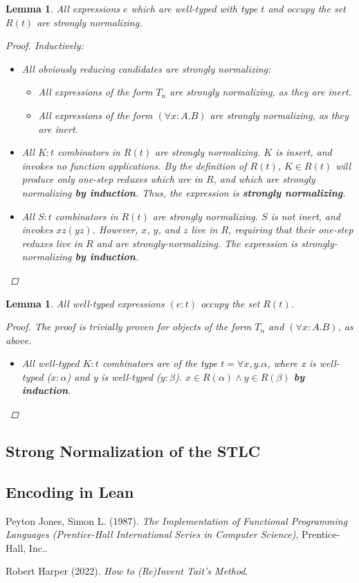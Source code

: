 \documentclass[11pt]{article}
\newtheorem{lemma}[theorem]{Lemma}
\begin{document}
\begin{enumerate}
\begin{lemma}
All expressions $e$ which are well-typed with type $t$ and occupy the set $R(t)$ are strongly normalizing.
\begin{proof}
Inductively: \\
\begin{itemize}
\item All obviously reducing candidates are strongly normalizing:
\begin{itemize}
\item All expressions of the form $T_{n}$ are strongly normalizing, as they are inert.
\item All expressions of the form $(\forall x : A.B)$ are strongly normalizing, as they are inert.
\end{itemize}
\item All $K : t$ combinators in $R(t)$ are strongly normalizing. $K$ is insert, and invokes no function applications. By the definition of $R(t)$, $K \in R(t)$ will produce only one-step reduxes which are in $R$, and which are strongly normalizing \textbf{by induction}. Thus, the expression is \textbf{strongly normalizing}.
\item All $S : t$ combinators in $R(t)$ are strongly normalizing. $S$ is not inert, and invokes $xz (yz)$. However, $x$, $y$, and $z$ live in $R$, requiring that their one-step reduxes live in $R$ and are strongly-normalizing. The expression is strongly-normalizing \textbf{by induction}.
\end{itemize}
\end{proof}
\end{lemma}
\begin{lemma}
All well-typed expressions $(e : t)$ occupy the set $R(t)$.
\begin{proof}
The proof is trivially proven for objects of the form $T_{n}$ and $(\forall x:A.B)$, as above.
\begin{itemize}
\item All well-typed $K : t$ combinators are of the type $t = \forall x, y.\alpha$, where x is well-typed ($x : \alpha$) and y is well-typed ($y : \beta$). $x \in R(\alpha) \land y \in R(\beta)$ \textbf{by induction}.
\end{itemize}
\end{proof}
\end{lemma}
\end{enumerate}
\subsection{Strong Normalization of the STLC}
\label{sec:orgb303d6f}
\subsection{Encoding in Lean}
\label{sec:org23b0bc9}

\noindent
Peyton Jones, Simon L. (1987). \emph{The Implementation of Functional Programming Languages (Prentice-Hall International Series in Computer Science)}, Prentice-Hall, Inc..

\noindent
Robert Harper (2022). \emph{How to (Re)Invent Tait’s Method}.
\end{document}

